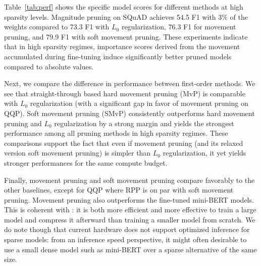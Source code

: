 \documentclass{article}
\begin{document}
Table~\ref{tab:perf} shows the specific model scores for different methods at high sparsity levels. Magnitude pruning on SQuAD achieves 54.5 F1 with 3\% of the weights compared to 73.3 F1 with $L_0$ regularization, 76.3 F1 for movement pruning, and 79.9 F1 with soft movement pruning. These experiments indicate that in high sparsity regimes, importance scores derived from the movement accumulated during fine-tuning induce significantly better pruned models compared to absolute values.

Next, we compare the difference in performance between first-order methods. We see that straight-through based hard movement pruning (MvP) is comparable with $L_0$ regularization (with a significant gap in favor of movement pruning on QQP). Soft movement pruning (SMvP) consistently outperforms hard movement pruning and $L_0$ regularization by a strong margin and yields the strongest performance among all pruning methods in high sparsity regimes. These comparisons support the fact that even if movement pruning (and its relaxed version soft movement pruning) is simpler than $L_0$ regularization, it yet yields stronger performances for the same compute budget. 

Finally, movement pruning and soft movement pruning compare favorably to the other baselines, except for QQP where RPP is on par with soft movement pruning. Movement pruning also outperforms the fine-tuned mini-BERT models.
This is coherent with \citep{Li2020TrainLT}: it is both more efficient and more effective to train a large model and compress it afterward than training a smaller model from scratch. We do note though that current hardware does not support optimized inference for sparse models: from an inference speed perspective, it might often desirable to use a small dense model such as mini-BERT over a sparse alternative of the same size.
\end{document}
